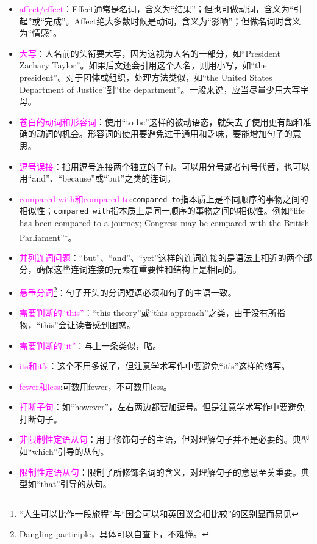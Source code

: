 \documentclass[cn,hazy,blue,14pt,screen]{elegantnote} %
\begin{document}
\begin{itemize}
  \item \textcolor{magenta}{affect/effect}：Effect通常是名词，含义为“结果”；但也可做动词，含义为“引起”或“完成”。Affect绝大多数时候是动词，含义为“影响”；但做名词时含义为“情感”。
  \item \textcolor{magenta}{大写}：人名前的头衔要大写，因为这视为人名的一部分，如“President Zachary Taylor”。如果后文还会引用这个人名，则用小写，如“the president”。对于团体或组织，处理方法类似，如“the United States Department of Justice”到“the department”。一般来说，应当尽量少用大写字母。
  \item \textcolor{magenta}{苍白的动词和形容词}：使用“to be”这样的被动语态，就失去了使用更有趣和准确的动词的机会。形容词的使用要避免过于通用和乏味，要能增加句子的意思。
  \item \textcolor{magenta}{逗号误接}：指用逗号连接两个独立的子句。可以用分号或者句号代替，也可以用“and”、“because”或“but”之类的连词。
  \item \textcolor{magenta}{compared with和compared to}:\lstinline{compared to}指本质上是不同顺序的事物之间的相似性；\lstinline{compared with}指本质上是同一顺序的事物之间的相似性。例如“life has been compared to a journey; Congress may be compared with the British Parliament”\footnote{“人生可以比作一段旅程”与“国会可以和英国议会相比较”的区别显而易见}。
  \item \textcolor{magenta}{并列连词问题}：“but”、“and”、“yet”这样的连词连接的是语法上相近的两个部分，确保这些连词连接的元素在重要性和结构上是相同的。
  \item \textcolor{magenta}{悬垂分词\footnote{Dangling participle，具体可以自查下，不难懂。}}：句子开头的分词短语必须和句子的主语一致。
  \item \textcolor{magenta}{需要判断的“this”}：“this theory”或“this approach”之类，由于没有所指物，“this”会让读者感到困惑。
  \item \textcolor{magenta}{需要判断的“it”}：与上一条类似，略。
  \item \textcolor{magenta}{its和it's}：这个不用多说了，但注意学术写作中要避免“it's”这样的缩写。
  \item \textcolor{magenta}{fewer和less}:可数用fewer，不可数用less。
  \item \textcolor{magenta}{打断子句}：如“however”，左右两边都要加逗号。但是注意学术写作中要避免打断句子。
  \item \textcolor{magenta}{非限制性定语从句}：用于修饰句子的主语，但对理解句子并不是必要的。典型如“which”引导的从句。
  \item \textcolor{magenta}{限制性定语从句}：限制了所修饰名词的含义，对理解句子的意思至关重要。典型如“that”引导的从句。

\end{itemize}
\end{document}
